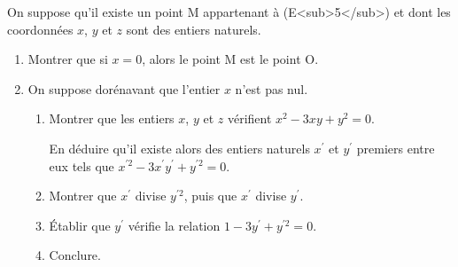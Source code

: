 On suppose qu'il existe un point M appartenant à (E<sub>5</sub>) et dont les coordonnées $x$, $y$ et $z$ sont des entiers naturels.
\begin{enumerate}
     \item
     Montrer que si $x=0$, alors le point M est le point O.
     \item
     On suppose dorénavant que l'entier $x$ n'est pas nul.
     \begin{enumerate}
          \item
          Montrer que les entiers $x$, $y$ et $z$ vérifient $x^{2}-3xy+y^{2}=0$.
          \par
          En déduire qu'il existe alors des entiers naturels $x^{\prime}$ et $y^{\prime}$ premiers entre eux tels que $x^{\prime 2}-3x^{\prime}y^{\prime}+y^{\prime 2}=0$.
          \item
          Montrer que $x^{\prime}$ divise $y^{\prime 2}$, puis que $x^{\prime}$ divise $y^{\prime}$.
          \item
          Établir que $y^{\prime}$ vérifie la relation $1-3y^{\prime}+y^{\prime 2}=0$.
          \item
          Conclure.
     \end{enumerate}
\end{enumerate}
